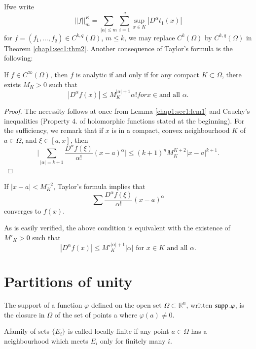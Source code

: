\begin{remark*}
  If\pageoriginale we write
  $$
  || f ||^K_m = \sum_{| \alpha | \leq m} \sum^q_{i =1} \sup _{x \in
    K}|D^{\alpha} t_1 (x) | 
  $$
  for $f = (f_1, \ldots, f_q) \in C^{k, q} (\Omega )$, $m \leq k$, we
  may replace $C^k(\Omega)$ by $C^{k, q}(\Omega)$ in
  Theorem \ref{chap1:sec1:thm2}. Another consequence of Taylor's
  formula is the following:  
\end{remark*}

\begin{proposition}\label{chap1:sec1:prop1}%
  If $f \in C^{\infty} (\Omega)$, then $f$ is analytic if and only if
  for any compact $K \subset \Omega$, there exists $M_K > 0$ such
  that 
  $$
  |D^{\alpha} f(x) | \leq M^{|\alpha| +1}_K \alpha ! for x \in \text{
    and all } {\alpha}.  
  $$
\end{proposition}

\begin{proof}
  The necessity follows at once from Lemma \ref{chap1:sec1:lem1} and
  Cauchy's inequalities 
  (Property $4$. of holomorphic functions stated at the
  beginning). For the sufficiency, we remark that if $x$ is in a
  compact, convex neighbourhood $K$ of $a \in \Omega$, and $\xi \in
  [a, x]$, then  
  $$
  \big| \sum_{|\alpha| = k+1} \frac{D^{\alpha} f(\xi)}{\alpha!} (x
  -a)^{\alpha} \big| \leq (k+1)^n M^{K+2}_K |x -a |^{k+1}. 
  $$
\end{proof}

If $|x-a| < M^{-2}_K$, Taylor's formula implies that 
$$
\sum \frac{D^{\alpha} f(\xi)}{\alpha!} (x -a)^{\alpha}
$$
converges to $f(x)$.

\begin{remark*}
  As is easily verified, the above condition is equivalent with the
  existence of $M'_K > 0$ such that  
  $$
  |D^{\alpha} f(x) | \leq M'^{| \alpha | + 1}_K | \alpha| \text{ for }
  x \in K \text{ and all } \alpha. 
  $$
\end{remark*}

\section{Partitions of unity}\label{chap1:sec2} %

The support of a function $\varphi$ defined on the open set $\Omega
\subset \mathbb{R}^n$, written $\operatorname{supp}. \varphi$, is the closure in
$\Omega$ of the set of points a where $\varphi (a) \neq 0$. 

A\pageoriginale family of sets $\{ E_i \}$ is called locally finite if any
point $a \in \Omega$ has a neighbourhood which meets $E_i$ only for
finitely many $i$. 

